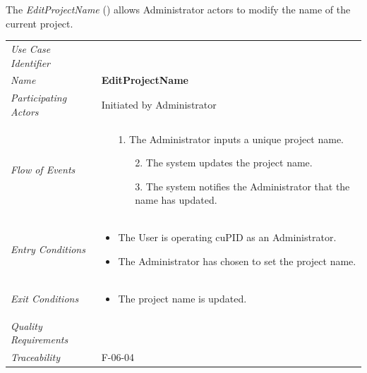 \documentclass[12pt,letterpaper]{article}
\begin{document}
\vspace{1em}
The {\it EditProjectName} ({\bf \editprojectname{}}) allows Administrator actors to modify the name of the current project.

\begin{center}
	\begin{tabu} to 
		\toprule
		Use Case Identifier & \editprojectname{} \\
		Name & {\bf EditProjectName} \\
		Participating Actors & Initiated by Administrator \\
		Flow of Events & 
		\begin{minipage}[t]{\linewidth}
		    \begin{enumerate}
			    \item[1.] The Administrator inputs a unique project name.
			    \begin{enumerate}
			        \item[2.] The system updates the project name.
			        \item[3.] The system notifies the Administrator that the name has updated.
			    \end{enumerate}
			\end{enumerate}
		\end{minipage} \\

		Entry Conditions &
		\begin{minipage}[t]{\linewidth}
			\begin{itemize}
			    \item The User is operating cuPID as an Administrator.
			    \item The Administrator has chosen to set the project name.
	        \end{itemize}
		\end{minipage} \\

		Exit Conditions &
		\begin{minipage}[t]{\linewidth}
			\begin{itemize}
			    \item The project name is updated.
	        \end{itemize}
		\end{minipage} \\

		Quality Requirements & \\

		Traceability & F-06-04 \\
		\toprule
	\end{tabu}
\end{center}
\end{document}
